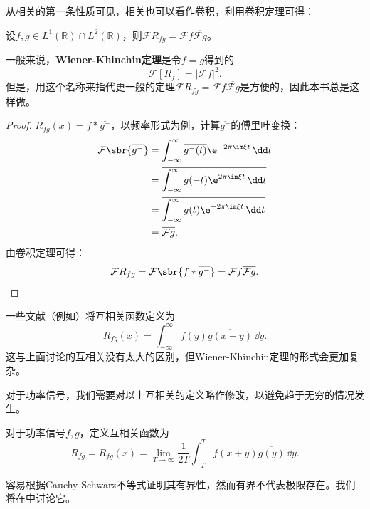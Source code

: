 从相关的第一条性质可见，相关也可以看作卷积，利用卷积定理可得：

\begin{theorem}\label{thm:winner-khinchin}
    设$f,g\in L^1(\mathbb{R})\cap L^2(\mathbb{R})$，则$\mathcal{F} R_{fg} =\mathcal{F} f\overline{\mathcal{F} g}$。
\end{theorem}
\begin{remark}
    一般来说，\textbf{Wiener-Khinchin定理}是令$f=g$得到的
    \begin{equation}
        \mathcal{F}[R_f]=|\mathcal{F} f|^2.
    \end{equation}
    但是，用这个名称来指代更一般的定理$\mathcal{F}R_{fg}=\mathcal{F}f\overline{\mathcal{F}g}$是方便的，因此本书总是这样做。
\end{remark}
\begin{proof}
    $R_{fg}(x)=f*\overline{g^-}$，以频率形式为例，计算$\overline{g^-}$的傅里叶变换：
    \begin{align}
        \mathcal{F}\sbr{\overline{g^-}} &= \int_{-\infty}^\infty \overline{g^-(t)}\e^{-2\pi\im\xi t}\,\dd t\nonumber \\
        &= \overline{\int_{-\infty}^\infty g(-t)\e^{2\pi\im\xi t}\,\dd t}\nonumber \\
        &= \overline{\int_{-\infty}^\infty g(t)\e^{-2\pi\im\xi t}\,\dd t}\nonumber   \\
        &= \overline{\mathcal{F}g}.
    \end{align}
    由卷积定理可得：
    \begin{equation}
        \mathcal{F}R_{fg}=\mathcal{F}\sbr{f*\overline{g^-}}=\mathcal{F}f\overline{\mathcal{F}g}.
    \end{equation}
\end{proof}

一些文献（例如\cite{brad_osgood_ee261}）将互相关函数定义为
\begin{equation}
    R_{fg}(x)=\int_{-\infty}^{\infty}f(y)\overline{g(x+y)}\,\dd y.
\end{equation}
这与上面讨论的互相关没有太大的区别，但Wiener-Khinchin定理的形式会更加复杂。

对于功率信号，我们需要对以上互相关的定义略作修改，以避免趋于无穷的情况发生。
\begin{definition}[功率信号的互相关]
    对于功率信号$f,g$，定义互相关函数为
    \begin{equation}
        R_{fg}=R_{fg}(x)=\lim_{T\to\infty}\frac{1}{2T}\int_{-T}^{T}f(x+y)\overline{g(y)}\,\dd y.
    \end{equation}
\end{definition}
容易根据Cauchy-Schwarz不等式证明其有界性，然而有界不代表极限存在。我们将在中讨论它。

